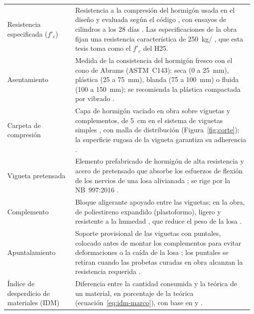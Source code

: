 \begin{longtable}{@{}P{3.1cm}P{12.7cm}@{}}
\addlinespace
Resistencia especificada ($f'_c$) & Resistencia a la compresión del hormigón usada en el diseño y evaluada según el código \parencite[sección~2.3, p.~38]{aci318_2025}, con ensayos de cilindros a los 28 días \parencite[sección~26.12.1.1, p.~601]{aci318_2025}. Las especificaciones de la obra fijan una resistencia característica de 250~kg/\cmdos{} \parencite[p.~3]{uatf_et}, que esta tesis toma como el $f'_c$ del H25. \\
\addlinespace
Asentamiento & Medida de la consistencia del hormigón fresco con el cono de Abrams (ASTM~C143): seca (0 a 25~mm), plástica (25 a 75~mm), blanda (75 a 100~mm) o fluida (100 a 150~mm); se recomienda la plástica compactada por vibrado \parencite[p.~9]{ucb2025et}. \\
\addlinespace
Carpeta de compresión & Capa de hormigón vaciado en obra sobre viguetas y complementos, de 5~cm en el sistema de viguetas simples \parencite[hoja~3]{concretec2018viguetas}, con malla de distribución (Figura~\ref{fig:corte}); la superficie rugosa de la vigueta garantiza su adherencia \parencite[p.~3]{uatf_et}. \\
\addlinespace
Vigueta pretensada & Elemento prefabricado de hormigón de alta resistencia y acero de pretensado que absorbe los esfuerzos de flexión de los nervios de una losa alivianada \parencite[hojas~1 y 2]{concretec2018viguetas}; se rige por la NB~997:2016 \parencite{nb997_2016}. \\
\addlinespace
Complemento & Bloque aligerante apoyado entre las viguetas; en la obra, de poliestireno expandido (plastoformo), ligero y resistente a la humedad \parencite[hoja~1]{concretec2016plastoformo}, que reduce el peso de la losa \parencite[hoja~3]{concretec2016plastoformo}. \\
\addlinespace
Apuntalamiento & Soporte provisional de las viguetas con puntales, colocado antes de montar los complementos para evitar deformaciones o la caída de la losa \parencite[hoja~3]{concretec2016plastoformo}; los puntales se retiran cuando las probetas curadas en obra alcanzan la resistencia requerida \parencite[sección~26.12.4.1, p.~604]{aci318_2025}. \\
\addlinespace
Índice de desperdicio de materiales (IDM) & Diferencia entre la cantidad consumida y la teórica de un material, en porcentaje de la teórica (ecuación~\ref{eq:idm-marco}), con base en \textcite[p.~9]{galarza2011} y \textcite[sección~2]{rossi2001}. \\
\end{longtable}
\vspace{-6pt}
\endgroup
